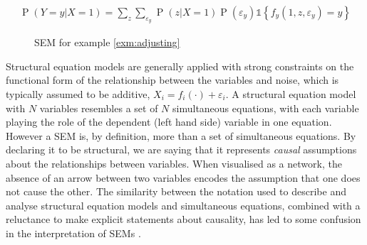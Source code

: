 \documentclass[11pt,a4paper,twoside]{report}
\newcommand{\set}[1]{\left\{#1\right\}}
\newcommand{\ind}[1]{\mathds{1}\!\!\set{#1}}
\newcommand{\eqn}[1]{\begin{align}#1\end{align}}
\renewcommand{\P}[1]{\operatorname{P}\left(#1\right)}
\theoremstyle{plain}
\theoremstyle{definition}
\let\epsilon\varepsilon
\begin{document}
\eqn{
\P{Y=y|X=1} = \sum_{z}\sum_{\epsilon_y}\P{z|X=1}\P{\epsilon_y}\ind{f_y(1,z,\epsilon_y)=y}
}


\begin{figure}[ht]
\centering
{}
\caption{SEM for example \ref{exm:adjusting}}
\label{fig:sem:preschool}
\end{figure}

Structural equation models are generally applied with strong constraints on the functional form of the relationship between the variables and noise, which is typically assumed to be additive, $X_i = f_i(\cdot)+\epsilon_i$. A structural equation model with $N$ variables resembles a set of $N$ simultaneous equations, with each variable playing the role of the dependent (left hand side) variable in one equation. However a SEM is, by definition, more than a set of simultaneous equations. By declaring it to be structural, we are saying that it represents \emph{causal} assumptions about the relationships between variables. When visualised as a network, the absence of an arrow between two variables encodes the assumption that one does not cause the other. The similarity between the notation used to describe and analyse structural equation models and simultaneous equations, combined with a reluctance to make explicit statements about causality, has led to some confusion in the interpretation of SEMs \citep{heckman2015causal,Pearl2000}.
\end{document}
